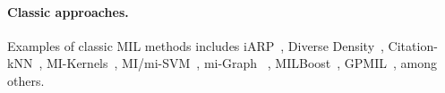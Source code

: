 \paragraph{Classic approaches.}
Examples of classic MIL methods includes iARP~\citep{dietterich1997solving}, 
Diverse Density~\citep{maron1997framework}, 
Citation-kNN~\citep{wang2000solving}, MI-Kernels~\citep{zhang2001dd}, MI/mi-SVM~\citep{andrews2002support}, mi-Graph ~\citep{zhou2009multi}, MILBoost~\citep{zhang2005multiple}, GPMIL~\citep{kim2010gaussian}, among others. 